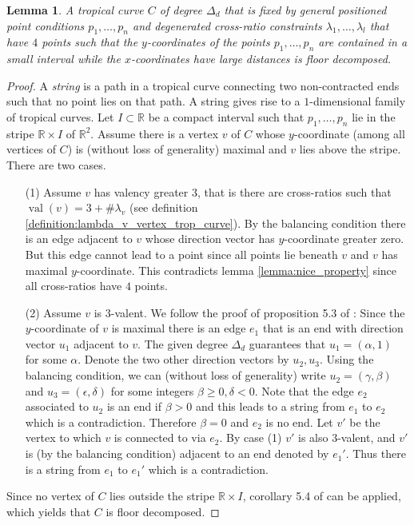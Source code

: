 \documentclass[11pt,reqno,a4]{amsart}
\theoremstyle{dotless}
\newtheorem{lemma}[corollary]{Lemma}
\theoremstyle{definition}
\newcommand{\val}{\operatorname{val}}
\begin{document}
\begin{lemma}\label{lemma:floor_decomposed_4_points}
A tropical curve $C$ of degree $\Delta_d$ that is fixed by general positioned point conditions $p_1,\dots,p_n$ and degenerated cross-ratio constraints $\lambda_1,\dots,\lambda_l$ that have $4$ points such that the $y$-coordinates of the points $p_1,\dots,p_n$ are contained in a small interval while the $x$-coordinates have large distances is floor decomposed.
\end{lemma}

\begin{proof}
A \textit{string} is a path in a tropical curve connecting two non-contracted ends such that no point lies on that path. A string gives rise to a $1$-dimensional family of tropical curves.
Let $I\subset \mathbb{R}$ be a compact interval such that $p_1,\dots,p_n$ lie in the stripe $\mathbb{R}\times I$ of $\mathbb{R}^2$. Assume there is a vertex $v$ of $C$ whose $y$-coordinate (among all vertices of $C$) is (without loss of generality) maximal and $v$ lies above the stripe. There are two cases.
\begin{itemize}
\item[(1)]
Assume $v$ has valency greater $3$, that is there are cross-ratios such that $\val(v)=3+\#\lambda_v$ (see definition \ref{definition:lambda_v_vertex_trop_curve}). By the balancing condition there is an edge adjacent to $v$ whose direction vector has $y$-coordinate greater zero. But this edge cannot lead to a point since all points lie beneath $v$ and $v$ has maximal $y$-coordinate. This contradicts lemma \ref{lemma:nice_property} since all cross-ratios have $4$ points.
\item[(2)]
Assume $v$ is $3$-valent. We follow the proof of proposition 5.3 of \cite{MikhalkinBrugalle}: Since the $y$-coordinate of $v$ is maximal there is an edge $e_1$ that is an end with direction vector $u_1$ adjacent to $v$. The given degree $\Delta_d$ guarantees that $u_1=(\alpha,1)$ for some $\alpha$. Denote the two other direction vectors by $u_2,u_3$. Using the balancing condition, we can (without loss of generality) write $u_2=(\gamma,\beta)$ and $u_3=(\epsilon,\delta)$ for some integers $\beta\geq 0,\delta<0$. Note that the edge $e_2$ associated to $u_2$ is an end if $\beta>0$ and this leads to a string from $e_1$ to $e_2$ which is a contradiction. Therefore $\beta=0$ and $e_2$ is no end. Let $v'$ be the vertex to which $v$ is connected to via $e_2$. By case (1) $v'$ is also $3$-valent, and $v'$ is (by the balancing condition) adjacent to an end denoted by $e_1'$. Thus there is a string from $e_1$ to $e_1'$ which is a contradiction.
\end{itemize}

Since no vertex of $C$ lies outside the stripe $\mathbb{R}\times I$, corollary 5.4 of \cite{MikhalkinBrugalle} can be applied, which yields that $C$ is floor decomposed.
\end{proof}
\end{document}
